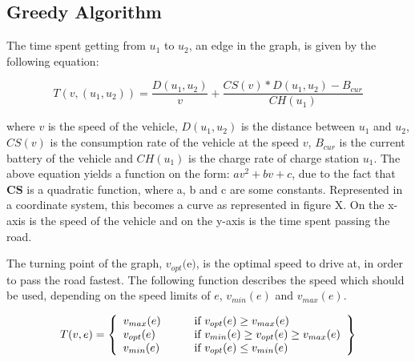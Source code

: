 \subsection{Greedy Algorithm}

The time spent getting from $u_1$ to $u_2$, an edge in the graph, is given by the following equation:

\[T(v,(u_1, u_2)) = \frac{D(u_1, u_2)}{v} + \frac{CS(v) * D(u_1, u_2) - B_{cur}}{CH(u_1)}\]

\begin{tikzpicture}
\end{tikzpicture}


where $v$ is the speed of the vehicle, $D(u_1, u_2)$ is the distance between $u_1$ and $u_2$, 
$CS(v)$ is the consumption rate of the vehicle at the speed $v$, $B_{cur}$ is the current battery
of the vehicle and $CH(u_1)$ is the charge rate of charge station $u_1$. The above equation yields 
a function on the form: $av^2 + bv + c$, due to the fact that $\textbf{CS}$ is a quadratic function, 
where a, b and c are some constants. Represented in a coordinate system, this becomes a curve as 
represented in figure X. On the x-axis is the speed of the vehicle and on the y-axis is the time 
spent passing the road. 

The turning point of the graph, $v_{opt}($e$)$, is the optimal speed to drive at, 
in order to pass the road fastest. The following function describes the speed which should be used, depending on the speed limits of $e$, $v_{min}(e)$ and $v_{max}(e)$.

\[ T(v, e) = \left\{ 
  \begin{array}{l l l}
    v_{max}(e) & \qquad \text{if $v_{opt}(e) \geq v_{max}(e)$}\\
    v_{opt}(e) & \qquad \text{if $v_{min}(e) \geq v_{opt}(e) \geq v_{max}(e)$}\\
    v_{min}(e) & \qquad \text{if $v_{opt}(e) \leq v_{min}(e)$}
  \end{array} \right\} \]
